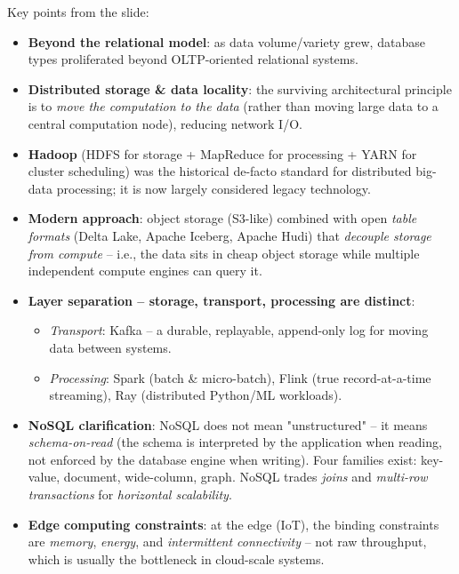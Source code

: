 Key points from the slide:

\begin{itemize}
    \item \textbf{Beyond the relational model}: as data volume/variety grew, database types proliferated beyond OLTP-oriented relational systems.
    \vspace{0.2cm}
    \item \textbf{Distributed storage \& data locality}: the surviving architectural principle is to \emph{move the computation to the data} (rather than moving large data to a central computation node), reducing network I/O.
    \vspace{0.2cm}
    \item \textbf{Hadoop} (HDFS for storage + MapReduce for processing + YARN for cluster scheduling) was the historical de-facto standard for distributed big-data processing; it is now largely considered legacy technology.
    \vspace{0.2cm}
    \item \textbf{Modern approach}: object storage (S3-like) combined with open \emph{table formats} (Delta Lake, Apache Iceberg, Apache Hudi) that \emph{decouple storage from compute} -- i.e., the data sits in cheap object storage while multiple independent compute engines can query it.
    \vspace{0.2cm}
    \item \textbf{Layer separation -- storage, transport, processing are distinct}:
    \begin{itemize}
        \item \emph{Transport}: Kafka -- a durable, replayable, append-only log for moving data between systems.
        \item \emph{Processing}: Spark (batch \& micro-batch), Flink (true record-at-a-time streaming), Ray (distributed Python/ML workloads).
    \end{itemize}
    \vspace{0.2cm}
    \item \textbf{NoSQL clarification}: NoSQL does not mean "unstructured" -- it means \emph{schema-on-read} (the schema is interpreted by the application when reading, not enforced by the database engine when writing). Four families exist: key-value, document, wide-column, graph. NoSQL trades \emph{joins} and \emph{multi-row transactions} for \emph{horizontal scalability}.
    \vspace{0.2cm}
    \item \textbf{Edge computing constraints}: at the edge (IoT), the binding constraints are \emph{memory}, \emph{energy}, and \emph{intermittent connectivity} -- not raw throughput, which is usually the bottleneck in cloud-scale systems.
\end{itemize}


